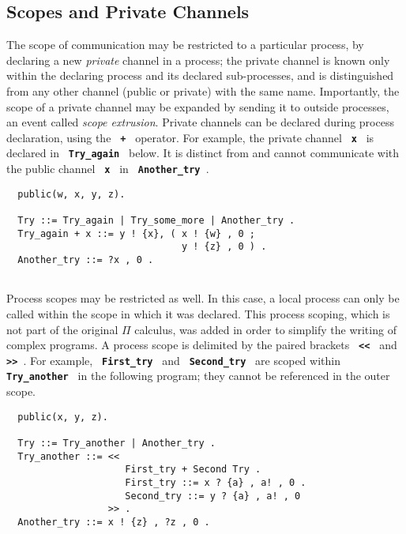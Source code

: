 \documentclass[twoside,10pt]{report}
\begin{document}
\subsection{Scopes and Private Channels}

The scope of communication may be restricted to a particular process,
by declaring a new {\em private} channel in a process; the private
channel is known only
within the declaring process and its declared sub-processes, and is
distinguished from any other channel (public or private) with the same
name.  Importantly, the scope of a private channel may be expanded by
sending it to outside processes, an event called {\em scope extrusion}. 
Private channels can be declared during process declaration, using the
{\bf \verb- + -} operator.  For example, the private channel {\bf \verb+ x +}
is declared in {\bf \verb+ Try_again +} below. It is distinct from and cannot 
communicate with the public channel {\bf \verb+ x +} in
{\bf \verb+ Another_try +}.

\begin{verbatim}
  public(w, x, y, z).

  Try ::= Try_again | Try_some_more | Another_try .
  Try_again + x ::= y ! {x}, ( x ! {w} , 0 ;
                               y ! {z} , 0 ) .
  Another_try ::= ?x , 0 .
 
\end{verbatim}

Process scopes may be restricted as well. In this case, a local
process can only be called within the scope in which it was
declared. This process scoping, which is not part of the original $\Pi$
calculus, was added in order to simplify the writing of complex
programs.  A process scope is delimited by the paired brackets
{\bf \verb+ << +} and {\bf \verb+ >> +}.  For example, {\bf \verb+ First_try +}
and {\bf \verb+ Second_try +} are scoped within {\bf \verb+ Try_another +} in
the following program; they cannot be referenced in the outer scope.

\begin{verbatim}
  public(x, y, z).

  Try ::= Try_another | Another_try .
  Try_another ::= << 
                     First_try + Second Try .
                     First_try ::= x ? {a} , a! , 0 .
                     Second_try ::= y ? {a} , a! , 0 
                  >> .
  Another_try ::= x ! {z} , ?z , 0 .
 
\end{verbatim}

\noindent
\end{document}
